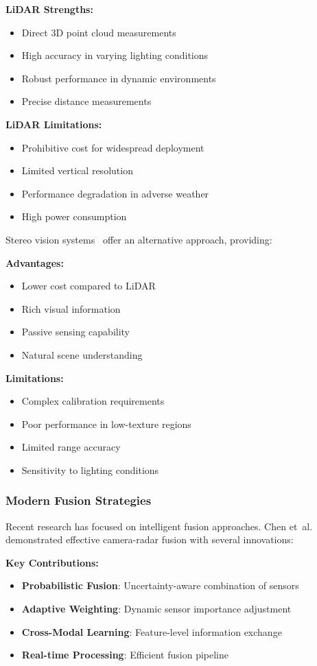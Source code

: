 \documentclass[12pt,oneside]{book}
\begin{document}
\textbf{LiDAR Strengths:}
\begin{itemize}
    \item Direct 3D point cloud measurements
    \item High accuracy in varying lighting conditions
    \item Robust performance in dynamic environments
    \item Precise distance measurements
\end{itemize}

\textbf{LiDAR Limitations:}
\begin{itemize}
    \item Prohibitive cost for widespread deployment
    \item Limited vertical resolution
    \item Performance degradation in adverse weather
    \item High power consumption
\end{itemize}

Stereo vision systems~\cite{menze2015joint} offer an alternative approach, providing:

\textbf{Advantages:}
\begin{itemize}
    \item Lower cost compared to LiDAR
    \item Rich visual information
    \item Passive sensing capability
    \item Natural scene understanding
\end{itemize}

\textbf{Limitations:}
\begin{itemize}
    \item Complex calibration requirements
    \item Poor performance in low-texture regions
    \item Limited range accuracy
    \item Sensitivity to lighting conditions
\end{itemize}

\subsubsection{Modern Fusion Strategies}
Recent research has focused on intelligent fusion approaches. Chen et~al.~\cite{chen2020multi} demonstrated effective camera-radar fusion with several innovations:

\textbf{Key Contributions:}
\begin{itemize}
    \item \textbf{Probabilistic Fusion}: Uncertainty-aware combination of sensors
    \item \textbf{Adaptive Weighting}: Dynamic sensor importance adjustment
    \item \textbf{Cross-Modal Learning}: Feature-level information exchange
    \item \textbf{Real-time Processing}: Efficient fusion pipeline
\end{itemize}
\end{document}
